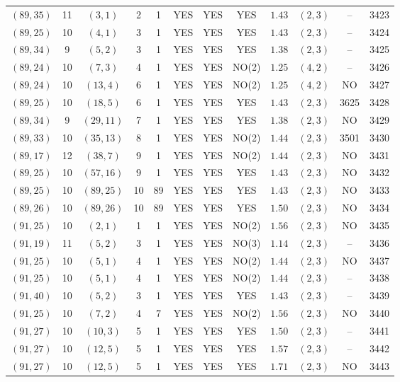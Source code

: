 \begin{longtable}{|c|c|c|c|c|c|c|c|c|c|c|c|}
$(89,35)$ & 11 & $(3,1)$ & 2 & 1 & YES & YES & YES & $1.43$ & $(2,3)$ & -- & 3423\\
$(89,25)$ & 10 & $(4,1)$ & 3 & 1 & YES & YES & YES & $1.43$ & $(2,3)$ & -- & 3424\\
$(89,34)$ & 9 & $(5,2)$ & 3 & 1 & YES & YES & YES & $1.38$ & $(2,3)$ & -- & 3425\\
$(89,24)$ & 10 & $(7,3)$ & 4 & 1 & YES & YES & NO(2) & $1.25$ & $(4,2)$ & -- & 3426\\
$(89,24)$ & 10 & $(13,4)$ & 6 & 1 & YES & YES & NO(2) & $1.25$ & $(4,2)$ & NO & 3427\\
$(89,25)$ & 10 & $(18,5)$ & 6 & 1 & YES & YES & YES & $1.43$ & $(2,3)$ & 3625 & 3428\\
$(89,34)$ & 9 & $(29,11)$ & 7 & 1 & YES & YES & YES & $1.38$ & $(2,3)$ & NO & 3429\\
$(89,33)$ & 10 & $(35,13)$ & 8 & 1 & YES & YES & NO(2) & $1.44$ & $(2,3)$ & 3501 & 3430\\
$(89,17)$ & 12 & $(38,7)$ & 9 & 1 & YES & YES & NO(2) & $1.44$ & $(2,3)$ & NO & 3431\\
$(89,25)$ & 10 & $(57,16)$ & 9 & 1 & YES & YES & YES & $1.43$ & $(2,3)$ & NO & 3432\\
$(89,25)$ & 10 & $(89,25)$ & 10 & 89 & YES & YES & YES & $1.43$ & $(2,3)$ & NO & 3433\\
$(89,26)$ & 10 & $(89,26)$ & 10 & 89 & YES & YES & YES & $1.50$ & $(2,3)$ & NO & 3434\\
$(91,25)$ & 10 & $(2,1)$ & 1 & 1 & YES & YES & NO(2) & $1.56$ & $(2,3)$ & NO & 3435\\
$(91,19)$ & 11 & $(5,2)$ & 3 & 1 & YES & YES & NO(3) & $1.14$ & $(2,3)$ & -- & 3436\\
$(91,25)$ & 10 & $(5,1)$ & 4 & 1 & YES & YES & NO(2) & $1.44$ & $(2,3)$ & NO & 3437\\
$(91,25)$ & 10 & $(5,1)$ & 4 & 1 & YES & YES & NO(2) & $1.44$ & $(2,3)$ & -- & 3438\\
$(91,40)$ & 10 & $(5,2)$ & 3 & 1 & YES & YES & YES & $1.43$ & $(2,3)$ & -- & 3439\\
$(91,25)$ & 10 & $(7,2)$ & 4 & 7 & YES & YES & NO(2) & $1.56$ & $(2,3)$ & NO & 3440\\
$(91,27)$ & 10 & $(10,3)$ & 5 & 1 & YES & YES & YES & $1.50$ & $(2,3)$ & -- & 3441\\
$(91,27)$ & 10 & $(12,5)$ & 5 & 1 & YES & YES & YES & $1.57$ & $(2,3)$ & -- & 3442\\
$(91,27)$ & 10 & $(12,5)$ & 5 & 1 & YES & YES & YES & $1.71$ & $(2,3)$ & NO & 3443\\

\end{longtable}
